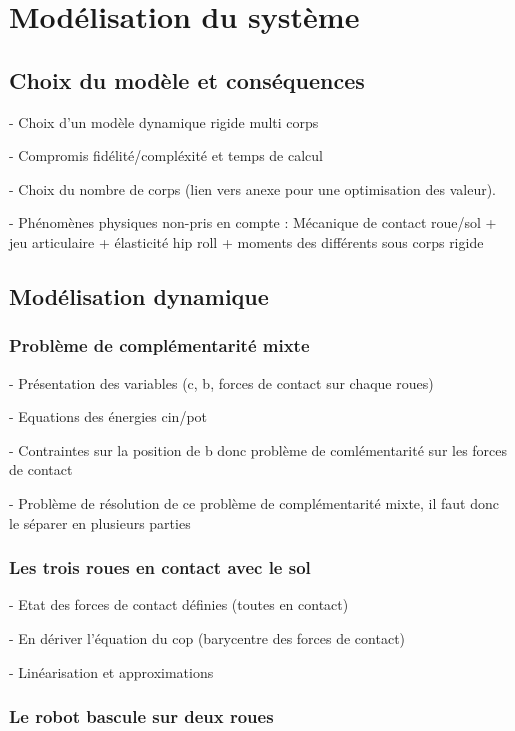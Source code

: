 \chapter{Modélisation du système}
\section{Choix du modèle et conséquences}
	
	- Choix d'un modèle dynamique rigide multi corps
	
	- Compromis fidélité/compléxité et temps de calcul
	
	- Choix du nombre de corps (lien vers anexe pour une optimisation des valeur).
	
	- Phénomènes physiques non-pris en compte : Mécanique de contact roue/sol + jeu articulaire + élasticité hip roll + moments des différents sous corps rigide
	
	\section{Modélisation dynamique}

		\subsection{Problème de complémentarité mixte}
		
		- Présentation des variables (c, b, forces de contact sur chaque roues)
		
		- Equations des énergies cin/pot

		- Contraintes sur la position de b donc problème de comlémentarité sur les forces de contact

		- Problème de résolution de ce problème de complémentarité mixte, il faut donc le séparer en plusieurs parties
		
		\subsection{Les trois roues en contact avec le sol}

		- Etat des forces de contact définies (toutes en contact)

		- En dériver l'équation du cop (barycentre des forces de contact)

		- Linéarisation et approximations
		
		\subsection{Le robot bascule sur deux roues}

